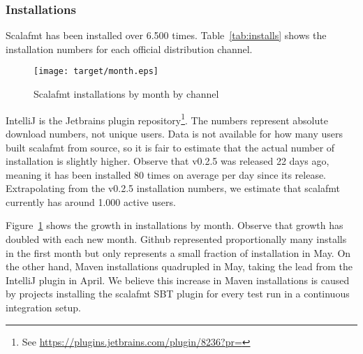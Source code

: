 \subsubsection{Installations}
Scalafmt has been installed over 6.500 times.
  Table~\ref{tab:installs} shows the installation numbers for each official distribution channel.
  \begin{figure}
    \CenterFloatBoxes
    \begin{floatrow}
      \ffigbox
      {\texttt{[image: target/month.eps]}}
      {\caption{Scalafmt installations by month by channel}\label{fig:installs}}
      \killfloatstyle
    \end{floatrow}
  \end{figure}
IntelliJ is the Jetbrains plugin repository\footnote{
  See \url{https://plugins.jetbrains.com/plugin/8236?pr=}
}.
The numbers represent absolute download numbers, not unique users.
Data is not available for how many users built scalafmt from source, so it is fair to estimate that the actual number of installation is slightly higher.
Observe that v0.2.5 was released 22 days ago, meaning it has been installed 80 times on average per day since its release.
Extrapolating from the v0.2.5 installation numbers, we estimate that scalafmt currently has around 1.000 active users.

Figure~\ref{fig:installs} shows the growth in installations by month.
Observe that growth has doubled with each new month.
Github represented proportionally many installs in the first month but only represents a small fraction of installation in May.
On the other hand, Maven installations quadrupled in May, taking the lead from the IntelliJ plugin in April.
We believe this increase in Maven installations is caused by projects installing the scalafmt SBT plugin for every test run in a continuous integration setup.

